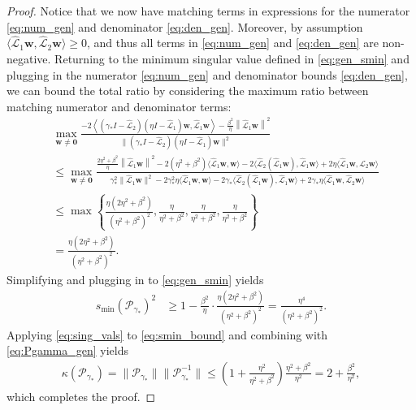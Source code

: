 \documentclass[review]{siamart}
\begin{document}
\begin{proof}
Notice that we now have matching terms in expressions for the numerator \eqref{eq:num_gen}
and denominator \eqref{eq:den_gen}. Moreover, by assumption
$\langle\widehat{\mathcal{L}}_1\mathbf{w},\widehat{\mathcal{L}}_2\mathbf{w}\rangle\geq 0$,
and thus all terms in \eqref{eq:num_gen} and \eqref{eq:den_gen} are non-negative.
Returning to the minimum singular value defined in \eqref{eq:gen_smin} and plugging in
the numerator \eqref{eq:num_gen} and denominator bounds \eqref{eq:den_gen}, we can
bound the total ratio by considering the maximum ratio between matching numerator
and denominator terms:
%
{\small
\begin{align}\nonumber
&\max_{\mathbf{w}\neq\mathbf{0}}
	\frac{-2\left\langle(\gamma_* I- \widehat{\mathcal{L}}_2)(\eta I- \widehat{\mathcal{L}}_1)\mathbf{w},
		\widehat{\mathcal{L}}_1\mathbf{w} \right\rangle-
		\frac{\beta^2}{\eta}\left\|\widehat{\mathcal{L}}_1\mathbf{w} \right\|^2}
	{\|(\gamma_* I- \widehat{\mathcal{L}}_2)(\eta I- \widehat{\mathcal{L}}_1)\mathbf{w}\|^2} \\
& \leq \max_{\mathbf{w}\neq\mathbf{0}}
	\frac{\frac{2\eta^2+\beta^2}{\eta}
			\left\|\widehat{\mathcal{L}}_1\mathbf{w} \right\|^2
		- 2(\eta^2+\beta^2)\langle \widehat{\mathcal{L}}_1\mathbf{w},\mathbf{w}\rangle
		- 2\langle\widehat{\mathcal{L}}_2(\widehat{\mathcal{L}}_1\mathbf{w}),\widehat{\mathcal{L}}_1\mathbf{w}\rangle
		+ 2\eta\langle\widehat{\mathcal{L}}_1\mathbf{w},\widehat{\mathcal{L}}_2\mathbf{w}\rangle
		}
	{\gamma_*^2\|\widehat{\mathcal{L}}_1\mathbf{w}\|^2
	- 2\gamma_*^2\eta\langle \widehat{\mathcal{L}}_1 \mathbf{w}, \mathbf{w}\rangle
	- 2\gamma_*\langle \widehat{\mathcal{L}}_2(\widehat{\mathcal{L}}_1\mathbf{w}),
		\widehat{\mathcal{L}}_1\mathbf{w}\rangle
	+ 2\gamma_*\eta\langle\widehat{\mathcal{L}}_1\mathbf{w},\widehat{\mathcal{L}}_2\mathbf{w}\rangle}
	\nonumber\\
& \leq \max \left\{ \frac{\eta(2\eta^2+\beta^2)}{(\eta^2+\beta^2)^2}, \frac{\eta}{\eta^2+\beta^2},
	\frac{\eta}{\eta^2+\beta^2}, \frac{\eta}{\eta^2+\beta^2}\right\} \nonumber \\
& = \frac{\eta(2\eta^2+\beta^2)}{(\eta^2+\beta^2)^2}.\label{eq:max_bound}
\end{align}
}
%
Simplifying and plugging in to \eqref{eq:gen_smin} yields
%
\begin{align}\label{eq:smin_bound}
s_{\min}(\mathcal{P}_{\gamma_*})^2 &\geq 1 - \frac{\beta^2}{\eta} \cdot
	\frac{\eta(2\eta^2+\beta^2)}{(\eta^2+\beta^2)^2}
= \frac{\eta^4}{(\eta^2+\beta^2)^2}.
\end{align}
%
Applying \eqref{eq:sing_vals} to \eqref{eq:smin_bound} and
combining with \eqref{eq:Pgamma_gen} yields
%
\begin{align}
\kappa(\mathcal{P}_{\gamma_*}) = \|\mathcal{P}_{\gamma_*}\|\|\mathcal{P}_{\gamma_*}^{-1}\|
	\leq \left(1+\frac{\eta^2}{\eta^2+\beta^2}\right)\frac{\eta^2+\beta^2}{\eta^2}
	= 2+\frac{\beta^2}{\eta^2},
\end{align}
%
which completes the proof.
\end{proof}
%
\end{document}

